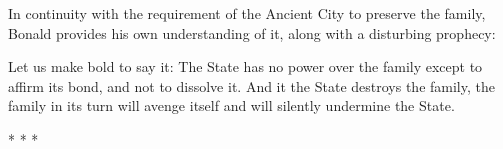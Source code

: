 In continuity with the requirement of the Ancient City to preserve the family, Bonald provides his own understanding of it, along with a disturbing prophecy:

\begin{quotex}
Let us make bold to say it: The State has no power over the family except to affirm its bond, and not to dissolve it. And it the State destroys the family, the family in its turn will avenge itself and will silently undermine the State. 

\end{quotex}



\begin{center}* * *\end{center}

